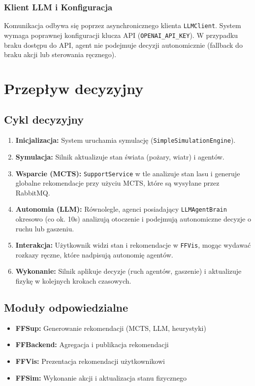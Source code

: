 \documentclass[11pt,a4paper]{article}
\begin{document}
\subsubsection{Klient LLM i Konfiguracja}

Komunikacja odbywa się poprzez asynchronicznego klienta \texttt{LLMClient}. System wymaga poprawnej konfiguracji klucza API (\texttt{OPENAI\_API\_KEY}). W przypadku braku dostępu do API, agent nie podejmuje decyzji autonomicznie (fallback do braku akcji lub sterowania ręcznego).


\section{Przepływ decyzyjny}

\subsection{Cykl decyzyjny}

\begin{enumerate}
    \item \textbf{Inicjalizacja:} System uruchamia symulację (\texttt{SimpleSimulationEngine}).
    \item \textbf{Symulacja:} Silnik aktualizuje stan świata (pożary, wiatr) i agentów.
    \item \textbf{Wsparcie (MCTS):} \texttt{SupportService} w tle analizuje stan lasu i generuje globalne rekomendacje przy użyciu MCTS, które są wysyłane przez RabbitMQ.
    \item \textbf{Autonomia (LLM):} Równolegle, agenci posiadający \texttt{LLMAgentBrain} okresowo (co ok. 10s) analizują otoczenie i podejmują autonomiczne decyzje o ruchu lub gaszeniu.
    \item \textbf{Interakcja:} Użytkownik widzi stan i rekomendacje w \texttt{FFVis}, mogąc wydawać rozkazy ręczne, które nadpisują autonomię agentów.
    \item \textbf{Wykonanie:} Silnik aplikuje decyzje (ruch agentów, gaszenie) i aktualizuje fizykę w kolejnych krokach czasowych.
\end{enumerate}

\subsection{Moduły odpowiedzialne}

\begin{itemize}
    \item \textbf{FFSup:} Generowanie rekomendacji (MCTS, LLM, heurystyki)
    \item \textbf{FFBackend:} Agregacja i publikacja rekomendacji
    \item \textbf{FFVis:} Prezentacja rekomendacji użytkownikowi
    \item \textbf{FFSim:} Wykonanie akcji i aktualizacja stanu fizycznego
\end{itemize}
\end{document}
